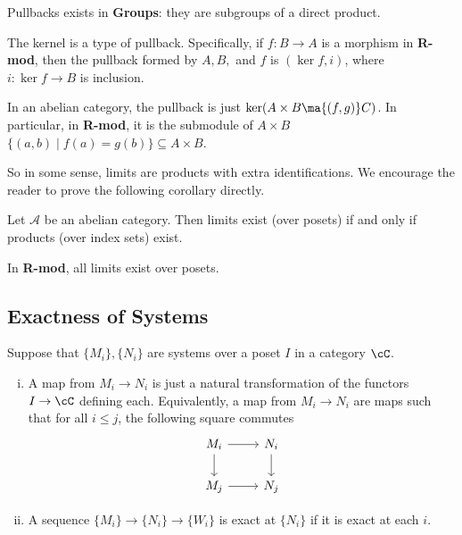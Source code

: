 \begin{ex}
Pullbacks exists in \textbf{Groups}: they are subgroups of a direct product. \xqed
\end{ex}


\begin{rem}
The kernel is a type of pullback. Specifically, if $f: B \to A$ is a morphism in \textbf{R-mod}, then the pullback formed by $A,B,$ and $f$ is $(\ker f,i)$, where $i: \ker f \to B$ is inclusion. 
\end{rem}


\begin{prop}
In an abelian category, the pullback is just $\ker( A \times B \ma{(f,g)} C)$. In particular, in \textbf{R-mod}, it is the submodule of $A \times B$ $\{(a,b)\;|\; f(a)=g(b)\} \subseteq A \times B$. 
\end{prop}


So in some sense, limits are products with extra identifications. We encourage the reader to prove the following corollary directly. 


\begin{prop}
Let $\mathcal{A}$ be an abelian category. Then limits exist (over posets) if and only if products (over index sets) exist.
\end{prop}


\begin{cor}
In \textbf{R-mod}, all limits exist over posets. 
\end{cor}



\subsection{Exactness of Systems}



\begin{dfn}
Suppose that $\{M_i\},\{N_i\}$ are systems over a poset $I$ in a category $\cC$. 
	\begin{enumerate}[(i)]
	\item A map from $M_i \rightarrow N_i$ is just a natural transformation of the functors $I \rightarrow \cC$ defining each. Equivalently, a map from $M_i \rightarrow N_i$ are maps such that for all $i \leq j$, the following square commutes
		\[
		\begin{tikzcd}
		M_i \arrow{r} \arrow{d} & N_i \arrow{d} \\
		M_j \arrow{r} & N_j
		\end{tikzcd}
		\]
	\item A sequence $\{M_i\} \rightarrow \{N_i\} \rightarrow \{W_i\}$ is exact at $\{N_i\}$ if it is exact at each $i$.
	\end{enumerate}
\end{dfn}



